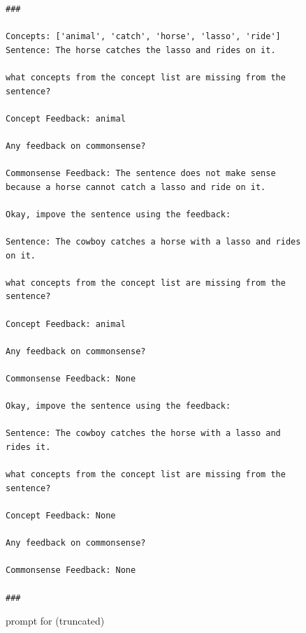 \begin{figure}

\begin{small}
    \captionsetup{justification=centering, labelfont=bf, font=small}
    \begin{verbatim}
###

Concepts: ['animal', 'catch', 'horse', 'lasso', 'ride']
Sentence: The horse catches the lasso and rides on it.

what concepts from the concept list are missing from the sentence?

Concept Feedback: animal

Any feedback on commonsense?

Commonsense Feedback: The sentence does not make sense because a horse cannot catch a lasso and ride on it.

Okay, impove the sentence using the feedback:

Sentence: The cowboy catches a horse with a lasso and rides on it.

what concepts from the concept list are missing from the sentence?

Concept Feedback: animal

Any feedback on commonsense?

Commonsense Feedback: None

Okay, impove the sentence using the feedback:

Sentence: The cowboy catches the horse with a lasso and rides it.

what concepts from the concept list are missing from the sentence?

Concept Feedback: None

Any feedback on commonsense?

Commonsense Feedback: None

###
\end{verbatim}

\end{small}
\caption{ \itermod prompt for \commongen (truncated)}
    \label{fig:prompt:commongen:refine}
\end{figure}